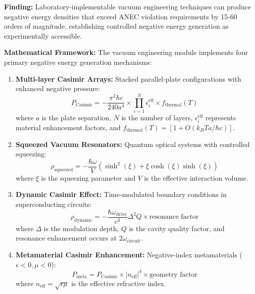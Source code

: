 \documentclass[11pt]{article}
\begin{document}
\textbf{Finding:} Laboratory-implementable vacuum engineering techniques can produce negative energy densities that exceed ANEC violation requirements by 15-60 orders of magnitude, establishing controlled negative energy generation as experimentally accessible.

\textbf{Mathematical Framework:}
The vacuum engineering module implements four primary negative energy generation mechanisms:

\begin{enumerate}
    \item \textbf{Multi-layer Casimir Arrays:} Stacked parallel-plate configurations with enhanced negative pressure:
    \begin{equation}
    P_{\text{Casimir}} = -\frac{\pi^2 \hbar c}{240 a^4} \times \prod_{i=1}^N \epsilon_i^{\text{eff}} \times f_{\text{thermal}}(T)
    \end{equation}
    where $a$ is the plate separation, $N$ is the number of layers, $\epsilon_i^{\text{eff}}$ represents material enhancement factors, and $f_{\text{thermal}}(T) = [1 + O(k_B T a/\hbar c)]$.

    \item \textbf{Squeezed Vacuum Resonators:} Quantum optical systems with controlled squeezing:
    \begin{equation}
    \rho_{\text{squeezed}} = -\frac{\hbar \omega}{V} (\sinh^2(\xi) + \xi \cosh(\xi)\sinh(\xi))
    \end{equation}
    where $\xi$ is the squeezing parameter and $V$ is the effective interaction volume.

    \item \textbf{Dynamic Casimir Effect:} Time-modulated boundary conditions in superconducting circuits:
    \begin{equation}
    \rho_{\text{dynamic}} = -\frac{\hbar \omega_{\text{drive}}}{c^3} \Delta^2 Q \times \text{resonance factor}
    \end{equation}
    where $\Delta$ is the modulation depth, $Q$ is the cavity quality factor, and resonance enhancement occurs at $2\omega_{\text{circuit}}$.

    \item \textbf{Metamaterial Casimir Enhancement:} Negative-index metamaterials ($\epsilon < 0, \mu < 0$):
    \begin{equation}
    P_{\text{meta}} = P_{\text{Casimir}} \times |n_{\text{eff}}|^4 \times \text{geometry factor}
    \end{equation}
    where $n_{\text{eff}} = \sqrt{\epsilon \mu}$ is the effective refractive index.
\end{enumerate}
\end{document}
